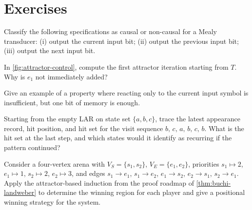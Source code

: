\section*{Exercises}

\begin{chapex}[Causality]
Classify the following specifications as causal or non-causal for a
Mealy transducer: (i) output the current input bit; (ii) output the
previous input bit; (iii) output the next input bit.
\end{chapex}

\begin{chapex}
In \cref{fig:attractor-control}, compute the first attractor iteration
starting from $T$.  Why is $e_1$ not immediately added?
\end{chapex}

\begin{chapex}
Give an example of a property where reacting only to the current input
symbol is insufficient, but one bit of memory is enough.
\end{chapex}

\begin{chapex}
Starting from the empty LAR on state set $\{a,b,c\}$, trace the latest
appearance record, hit position, and hit set for the visit sequence
$b,\,c,\,a,\,b,\,c,\,b$.  What is the hit set at the last step, and
which states would it identify as recurring if the pattern continued?
\end{chapex}

\begin{chapex}
Consider a four-vertex arena with $V_S=\{s_1,s_2\}$,
$V_E=\{e_1,e_2\}$, priorities $s_1\mapsto 2$, $e_1\mapsto 1$,
$s_2\mapsto 2$, $e_2\mapsto 3$, and edges
$s_1\to e_1$, $s_1\to e_2$, $e_1\to s_2$, $e_2\to s_1$,
$s_2\to e_1$.  Apply the attractor-based induction from the proof
roadmap of \cref{thm:buchi-landweber} to determine the winning region
for each player and give a positional winning strategy for the system.
\end{chapex}
